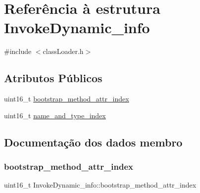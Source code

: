 \hypertarget{struct_invoke_dynamic__info}{}\section{Referência à estrutura Invoke\+Dynamic\+\_\+info}
\label{struct_invoke_dynamic__info}


{\ttfamily \#include $<$class\+Loader.\+h$>$}

\subsection*{Atributos Públicos}
\begin{DoxyCompactItemize}
\item 
uint16\+\_\+t \hyperlink{struct_invoke_dynamic__info_af4b996e4c8f0c912796b8e474976b231}{bootstrap\+\_\+method\+\_\+attr\+\_\+index}
\item 
uint16\+\_\+t \hyperlink{struct_invoke_dynamic__info_af3f2fac99fd7552370fabbeb4d81ee49}{name\+\_\+and\+\_\+type\+\_\+index}
\end{DoxyCompactItemize}


\subsection{Documentação dos dados membro}
\hypertarget{struct_invoke_dynamic__info_af4b996e4c8f0c912796b8e474976b231}{}\label{struct_invoke_dynamic__info_af4b996e4c8f0c912796b8e474976b231} 
\subsubsection{\texorpdfstring{bootstrap\+\_\+method\+\_\+attr\+\_\+index}{bootstrap\_method\_attr\_index}}
{\footnotesize\ttfamily uint16\+\_\+t Invoke\+Dynamic\+\_\+info\+::bootstrap\+\_\+method\+\_\+attr\+\_\+index}

\hypertarget{struct_invoke_dynamic__info_af3f2fac99fd7552370fabbeb4d81ee49}{}\label{struct_invoke_dynamic__info_af3f2fac99fd7552370fabbeb4d81ee49} 
